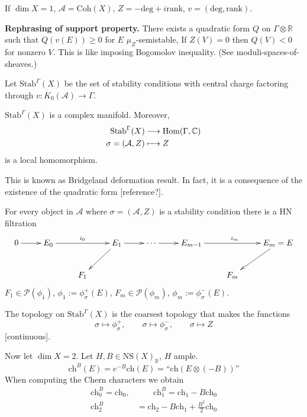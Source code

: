 \begin{exercise}
\label{bsgt-label-003}
If $\dim X=1$, $\mathcal{A}=\text{Coh}(X)$,
$Z= - \text{deg}+i \text{rank}$,
$v=(\text{deg},\text{rank})$.
\end{exercise}

\medskip\noindent
{\bf Rephrasing of support property.} There
exists a quadratic form $Q$ on $\Gamma
\otimes \mathbb{R}$ such that $Q(v(E))\geq 0$
for $E$ $\mu_Z$-semistable, If $Z(V)=0$ then
$Q(V)<0$ for nonzero $V$. This is like
imposing Bogomolov inequality. (See
moduli-spaces-of-sheaves.)

\medskip\noindent
Let $\text{Stab}^\Gamma(X)$ be the set of
stability conditions with central charge
factoring through
$v:K_0(\mathcal{A})\to\Gamma$.

\begin{theorem}[Bridgeland]
\label{theorem-Bridgeland}
$\text{Stab}^\Gamma(X)$ is a complex
manifold. Moreover,
$$
\begin{aligned}
\text{Stab}^\Gamma(X) &\longrightarrow
\mathop{\mathrm{Hom}}\nolimits(\Gamma,\mathbb{C}) \\
\sigma=(\mathcal{A},Z) &\longmapsto Z
\end{aligned}
$$
is a local homomorphism.
\end{theorem}

This is known as Bridgeland deformation
result. In fact, it is a consequence of the
existence of the quadratic form [reference?].

For every object in $\mathcal{A}$ where
$\sigma=(\mathcal{A},Z)$ is a stability
condition there is a HN filtration
$$
\xymatrix{
0\ar[r]&E_0\ar[rr]^{i_0}&&E_1\ar[dl]\ar[r]&
\cdots\ar[r]
&E_{m-1}\ar[rr]^{i_m}&&E_m=E\ar[dl]\\
&&F_1& & & & F_m
}
$$
$F_1 \in \mathcal{P}(\phi_1)$,
$\phi_1:=\phi^+_\sigma(E)$, $F_m \in
\mathcal{P}(\phi_m)$,
$\phi_m:=\phi_\sigma^-(E)$.

The topology on $\text{Stab}^\Gamma(X)$ is
the coarsest topology that makes the
functions
$$
\sigma \mapsto \phi^+_\sigma,\qquad \sigma
\mapsto \phi^-_\sigma, \qquad
\sigma \mapsto Z
$$
[continuous].

\medskip\noindent
Now let $\dim X=2$. Let $H,B \in
\text{NS}(X)_\mathbb{R}$, $H$ ample.
$$
\text{ch}^B(E)=e^{-B}\text{ch}(E)=
\text{``$\text{ch}(E\otimes
(-B))$''}
$$
When computing the Chern characters we obtain
$$
\begin{aligned}
\text{ch}_0^B = \text{ch}_0,&\qquad
\text{ch}_1^B=\text{ch}_1-B\text{ch}_0\\
\text{ch}_2^B&=\text{ch}_2-B\text{ch}_1+
\frac{B^2}{2}\text{ch}_0
\end{aligned}
$$

